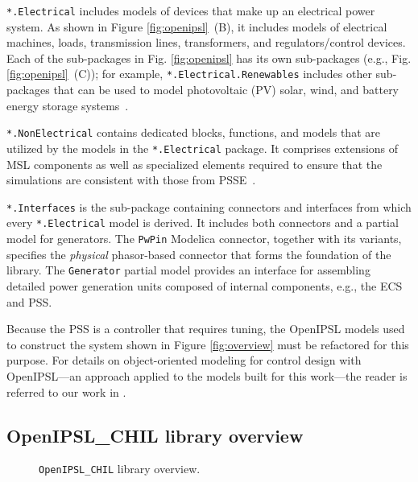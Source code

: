 \squishlist
    \item \texttt{*.Electrical} includes models of devices that make up an electrical power system. As shown in Figure \ref{fig:openipsl}~(B), it includes models of electrical machines, loads, transmission lines, transformers, and regulators/control devices. Each of the sub-packages in Fig. \ref{fig:openipsl} has its own sub-packages (e.g., Fig. \ref{fig:openipsl}~(C)); for example, \texttt{*.Electrical.Renewables} includes other sub-packages that can be used to model photovoltaic (PV) solar, wind, and battery energy storage systems~\cite{Fachini2025_RENE}.
    \item \texttt{*.NonElectrical} contains dedicated blocks, functions, and models that are utilized by the models in the \texttt{*.Electrical} package. It comprises extensions of MSL components as well as specialized elements required to ensure that the simulations are consistent with those from PSS\regtm{}E~\cite{psse,laera}.
    \item \texttt{*.Interfaces} is the sub-package containing connectors and interfaces from which every \texttt{*.Electrical} model is derived. It includes both connectors and a partial model for generators. The \texttt{PwPin} Modelica connector, together with its variants, specifies the \emph{physical} phasor-based connector that forms the foundation of the library. The \texttt{Generator} partial model provides an interface for assembling detailed power generation units composed of internal components, e.g., the ECS and PSS.
\squishend

\noindent{}Because the PSS is a controller that requires tuning, the OpenIPSL models used to construct the system shown in Figure \ref{fig:overview} must be refactored for this purpose. For details on object-oriented modeling for control design with OpenIPSL---an approach applied to the models built for this work---the reader is referred to our work in \cite{Vanfretti2024_Modelica, Bhattacharjee2024_American}.

\subsection{OpenIPSL\_CHIL library overview}

\begin{figure}[t!]
    \centerline{}
    \vspace{-2ex}
    \caption{\texttt{OpenIPSL\_CHIL} library overview.}
    \vspace{-4ex}
    \label{fig:openipsl_CHIL}
\end{figure}

